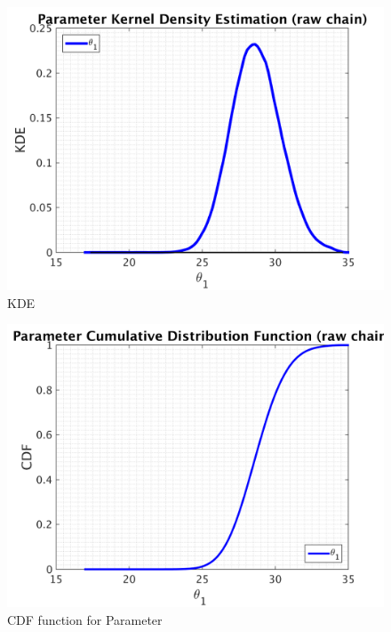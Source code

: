 \begin{figure}[H]
  
  \centering
   \includegraphics[scale=0.75]{53_results/output_100/simple_ip_kde_raw}
   \caption{ KDE }
\end{figure}
%
\clearpage

\begin{figure}[H]
  
  \centering
   \includegraphics[scale=0.75]{53_results/output_100/simple_ip_cdf_raw}
   \caption{CDF function for Parameter }
\end{figure}

\clearpage

